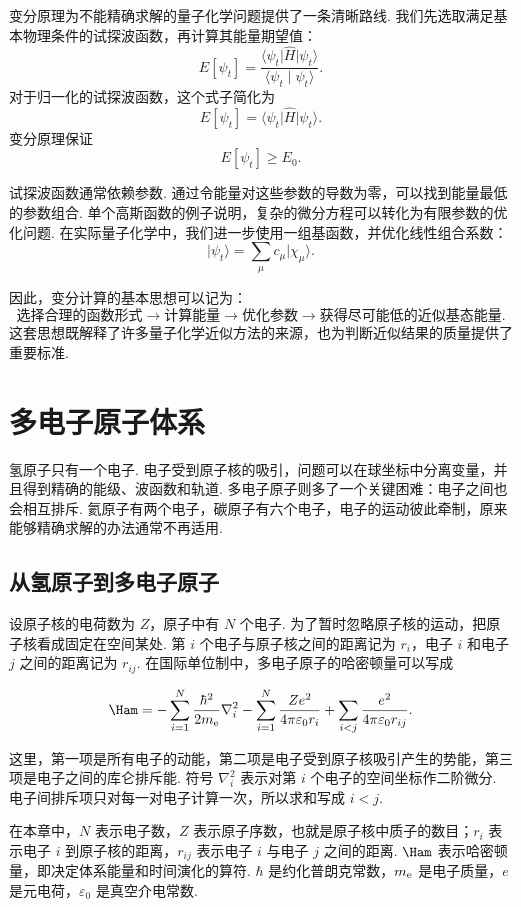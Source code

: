 \documentclass[UTF8,11pt,a4paper,openany]{ctexbook}
\newcommand{\ket}[1]{\lvert #1\rangle}\newcommand{\bra}[1]{\langle #1\rvert}
\newcommand{\braket}[2]{\langle #1\mid #2\rangle}\newcommand{\ii}{\mathrm i}
\begin{document}
变分原理为不能精确求解的量子化学问题提供了一条清晰路线. 我们先选取满足基本物理条件的试探波函数，再计算其能量期望值：
\[
E[\psi_t]
=
\frac{\bra{\psi_t}\hat H\ket{\psi_t}}
{\braket{\psi_t}{\psi_t}}.
\]
对于归一化的试探波函数，这个式子简化为
\[
E[\psi_t]
=
\bra{\psi_t}\hat H\ket{\psi_t}.
\]
变分原理保证
\[
E[\psi_t]\geq E_0.
\]

试探波函数通常依赖参数. 通过令能量对这些参数的导数为零，可以找到能量最低的参数组合. 单个高斯函数的例子说明，复杂的微分方程可以转化为有限参数的优化问题. 在实际量子化学中，我们进一步使用一组基函数，并优化线性组合系数：
\[
\ket{\psi_t}
=
\sum_\mu c_\mu\ket{\chi_\mu}.
\]

因此，变分计算的基本思想可以记为：
\[
\text{选择合理的函数形式}
\longrightarrow
\text{计算能量}
\longrightarrow
\text{优化参数}
\longrightarrow
\text{获得尽可能低的近似基态能量}.
\]
这套思想既解释了许多量子化学近似方法的来源，也为判断近似结果的质量提供了重要标准. 
\chapter{多电子原子体系}

氢原子只有一个电子. 电子受到原子核的吸引，问题可以在球坐标中分离变量，并且得到精确的能级、波函数和轨道. 多电子原子则多了一个关键困难：电子之间也会相互排斥. 氦原子有两个电子，碳原子有六个电子，电子的运动彼此牵制，原来能够精确求解的办法通常不再适用. 

\section{从氢原子到多电子原子}

设原子核的电荷数为 $Z$，原子中有 $N$ 个电子. 为了暂时忽略原子核的运动，把原子核看成固定在空间某处. 第 $i$ 个电子与原子核之间的距离记为 $r_i$，电子 $i$ 和电子 $j$ 之间的距离记为 $r_{ij}$. 在国际单位制中，多电子原子的哈密顿量可以写成

\[
\Ham
=
-\sum_{i=1}^{N}
\frac{\hbar^2}{2m_{\rm e}}\nabla_i^2
-
\sum_{i=1}^{N}
\frac{Ze^2}{4\pi\varepsilon_0 r_i}
+
\sum_{i<j}
\frac{e^2}{4\pi\varepsilon_0 r_{ij}}.
\]

这里，第一项是所有电子的动能，第二项是电子受到原子核吸引产生的势能，第三项是电子之间的库仑排斥能. 符号 $\nabla_i^2$ 表示对第 $i$ 个电子的空间坐标作二阶微分. 电子间排斥项只对每一对电子计算一次，所以求和写成 $i<j$. 

\begin{notationbox}
在本章中，$N$ 表示电子数，$Z$ 表示原子序数，也就是原子核中质子的数目；$r_i$ 表示电子 $i$ 到原子核的距离，$r_{ij}$ 表示电子 $i$ 与电子 $j$ 之间的距离. $\Ham$ 表示哈密顿量，即决定体系能量和时间演化的算符. $\hbar$ 是约化普朗克常数，$m_{\rm e}$ 是电子质量，$e$ 是元电荷，$\varepsilon_0$ 是真空介电常数. 
\end{notationbox}
\end{document}

